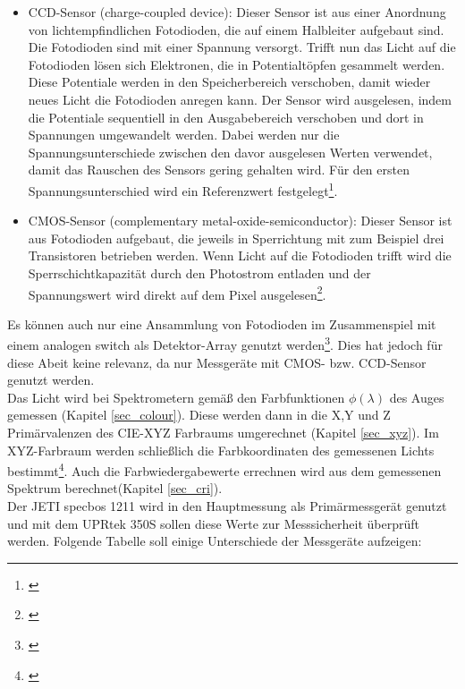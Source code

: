 \begin{itemize}
\item CCD-Sensor (charge-coupled device): Dieser Sensor ist aus einer Anordnung von lichtempfindlichen Fotodioden, die auf einem Halbleiter aufgebaut sind. Die Fotodioden sind mit einer Spannung versorgt. Trifft nun das Licht auf die Fotodioden lösen sich Elektronen, die in Potentialtöpfen gesammelt werden. Diese Potentiale werden in den Speicherbereich verschoben, damit wieder neues Licht die Fotodioden anregen kann. Der Sensor wird ausgelesen, indem die Potentiale sequentiell in den Ausgabebereich verschoben und dort in Spannungen umgewandelt werden. Dabei werden nur die Spannungsunterschiede zwischen den davor ausgelesen Werten verwendet, damit das Rauschen des Sensors gering gehalten wird. Für den ersten Spannungsunterschied wird ein Referenzwert festgelegt\footnote{\cite[17]{jeti}}.

\item CMOS-Sensor (complementary metal-oxide-semiconductor): Dieser Sensor ist aus Fotodioden aufgebaut, die jeweils in Sperrichtung mit zum Beispiel drei Transistoren betrieben werden. Wenn Licht auf die Fotodioden trifft wird die Sperrschichtkapazität durch den Photostrom entladen und der Spannungswert wird direkt auf dem Pixel ausgelesen\footnote{\cite[369]{schmidt}}.

\end{itemize}
Es können auch nur eine Ansammlung von Fotodioden im Zusammenspiel mit einem analogen switch als Detektor-Array genutzt werden\footnote{\cite[18]{jeti}}. Dies hat jedoch für diese Abeit keine relevanz, da nur Messgeräte mit CMOS- bzw. CCD-Sensor genutzt werden.\\

Das Licht wird bei Spektrometern gemäß den Farbfunktionen $\phi(\lambda)$ des Auges gemessen (Kapitel \ref{sec_colour}). Diese werden dann in die X,Y und Z Primärvalenzen des CIE-XYZ Farbraums umgerechnet (Kapitel \ref{sec_xyz}). Im XYZ-Farbraum werden schließlich die Farbkoordinaten des gemessenen Lichts bestimmt\footnote{\cite[30]{jeti}}. Auch die Farbwiedergabewerte errechnen wird aus dem gemessenen Spektrum berechnet(Kapitel \ref{sec_cri}).\\

Der JETI specbos 1211 wird in den Hauptmessung als Primärmessgerät genutzt und mit dem UPRtek 350S sollen diese Werte zur Messsicherheit überprüft werden. Folgende Tabelle soll einige Unterschiede der Messgeräte aufzeigen:

